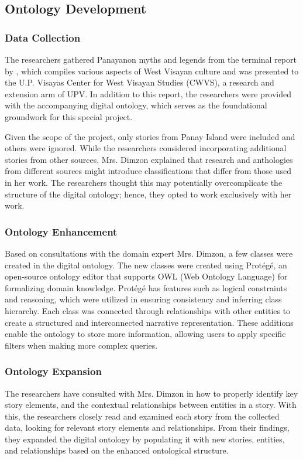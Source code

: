 \subsection{Ontology Development}
\subsubsection{Data Collection} 
    The researchers gathered Panayanon myths and legends from the terminal report by , which compiles various aspects of West Visayan culture and was presented to the U.P. Visayas Center for West Visayan Studies (CWVS), a research and extension arm of UPV. In addition to this report, the researchers were provided with the accompanying digital ontology, which serves as the foundational groundwork for this special project. 
    
    Given the scope of the project, only stories from Panay Island were included and others were ignored. While the researchers considered incorporating additional stories from other sources, Mrs. Dimzon explained that research and anthologies from different sources might introduce classifications that differ from those used in her work. The researchers thought this may potentially overcomplicate the structure of the digital ontology; hence, they opted to work exclusively with her work.
    
\subsubsection{Ontology Enhancement} 
    Based on consultations with the domain expert Mrs. Dimzon, a few classes were created in the digital ontology. The new classes were created using Protégé, an open-source ontology editor that supports OWL (Web Ontology Language) for formalizing domain knowledge. Protégé has features such as logical constraints and reasoning, which were utilized in ensuring consistency and inferring class hierarchy. Each class was connected through relationships with other entities to create a structured and interconnected narrative representation. These additions enable the ontology to store more information, allowing users to apply specific filters when making more complex queries.

\subsubsection{Ontology Expansion}
    The researchers have consulted with Mrs. Dimzon in how to properly identify key story elements, and the contextual relationships between entities in a story. With this, the researchers closely read and examined each story from the collected data, looking for relevant story elements and relationships. From their findings, they expanded the digital ontology by populating it with new stories, entities, and relationships based on the enhanced ontological structure. 
    
